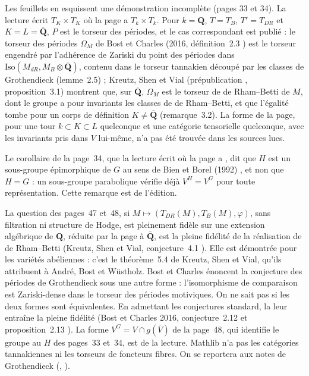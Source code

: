 {\small Les feuillets en esquissent une démonstration incomplète (pages 33 et 34). La lecture écrit $T_K \times T_K$ où la page a $T_k \times T_k$. Pour $k = \mathbf Q$, $T = T_B$, $T' = T_{DR}$ et $K = L = \overline{\mathbf Q}$, $P$ est le torseur des périodes, et le cas correspondant est publié : le torseur des périodes $\Omega_M$ de Bost et Charles (2016, définition~2.3 \cite{bostcharles2016}) est le torseur engendré par l'adhérence de Zariski du point des périodes dans $\mathrm{Iso}(M_{dR}, M_B \otimes \overline{\mathbf Q})$, contenu dans le torseur tannakien découpé par les classes de Grothendieck (lemme~2.5) ; Kreutz, Shen et Vial (prépublication \cite{kreutzshenvial}, proposition~3.1) montrent que, sur $\overline{\mathbf Q}$, $\Omega_M$ est le torseur de de Rham--Betti de $M$, dont le groupe a pour invariants les classes de de Rham--Betti, et que l'égalité tombe pour un corps de définition $K \neq \overline{\mathbf Q}$ (remarque~3.2). La forme de la page, pour une tour $k \subset K \subset L$ quelconque et une catégorie tensorielle quelconque, avec les invariants pris dans $V$ lui-même, n'a pas été trouvée dans les sources lues.

Le corollaire de la page~34, que la lecture écrit  où la page a , dit que $H$ est un sous-groupe épimorphique de $G$ au sens de Bien et Borel (1992) \cite{bienborel1992}, et non que $H = G$ : un sous-groupe parabolique vérifie déjà $V^H = V^G$ pour toute représentation. Cette remarque est de l'édition.

La question des pages~47 et~48, si $M \mapsto (T_{DR}(M), T_B(M), \varphi)$, sans filtration ni structure de Hodge, est pleinement fidèle sur une extension algébrique de $\mathbf Q$, réduite par la page à $\overline{\mathbf Q}$, est la pleine fidélité de la réalisation de de Rham--Betti (Kreutz, Shen et Vial, conjecture~4.1 \cite{kreutzshenvial}). Elle est démontrée pour les variétés abéliennes : c'est le théorème~5.4 de Kreutz, Shen et Vial, qu'ils attribuent à André, Bost et Wüstholz. Bost et Charles énoncent la conjecture des périodes de Grothendieck sous une autre forme : l'isomorphisme de comparaison est Zariski-dense dans le torseur des périodes motiviques. On ne sait pas si les deux formes sont équivalentes. En admettant les conjectures standard, la leur entraîne la pleine fidélité (Bost et Charles 2016, conjecture~2.12 et proposition~2.13 \cite{bostcharles2016}). La forme $V^G = V \cap g(\overline V)$ de la page~48, qui identifie le groupe au $H$ des pages~33 et~34, est de la lecture. Mathlib n'a pas les catégories tannakiennes ni les torseurs de foncteurs fibres. On se reportera aux notes de Grothendieck (, ).\par}

